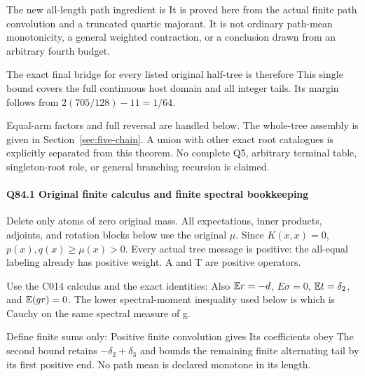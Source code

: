 The new all-length path ingredient is
It is proved here from the actual finite path convolution and a truncated
quartic majorant. It is not ordinary path-mean monotonicity, a general
weighted contraction, or a conclusion drawn from an arbitrary fourth
budget.

The exact final bridge for every listed original half-tree is therefore
This single bound covers the full continuous host domain and all integer
tails. Its margin follows from \(2(705/128)-11=1/64\).

Equal-arm factors and full reversal are handled below. The whole-tree assembly is given in Section~\ref{sec:five-chain}. A union with other exact root
catalogues is explicitly separated from this theorem. No complete Q5,
arbitrary terminal table, singleton-root role, or general branching
recursion is claimed.

\paragraph{Q84.1 Original finite calculus and finite spectral bookkeeping}

Delete only atoms of zero original mass. All expectations, inner products,
adjoints, and rotation blocks below use the original \(\mu\). Since
\(K(x,\allowbreak  x)=0\), \(p(x),\allowbreak  q(x)\ge\mu(x)>0\). Every actual tree message is
positive: the all-equal labeling already has positive weight. A and T are
positive operators.

Use the C014 calculus and the exact identities:
Also \(\mathbb E r=-d\), \(E\sigma=0\), \(\mathbb E t=\delta_2\), and \(\mathbb E(gr)=0\).
The lower spectral-moment inequality used below is
which is Cauchy on the same spectral measure of g.

Define finite sums only:
Positive finite convolution gives
Its coefficients obey
The second bound retains \(-\delta_2+\delta_3\) and bounds the remaining finite
alternating tail by its first positive end. No path mean is declared
monotone in its length.

